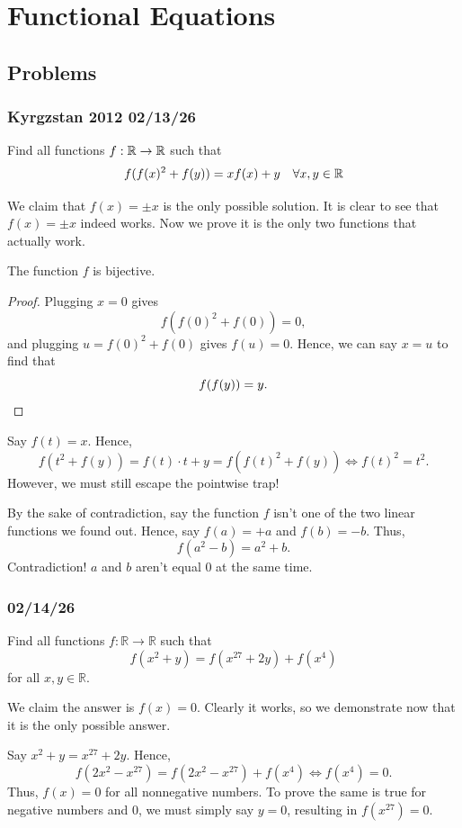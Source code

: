\section{\textsf{Functional Equations}}
\subsection{Problems}
\subsubsection{Kyrgzstan 2012 02/13/26}
\begin{problem}
Find all functions $ f:\mathbb{R}\to\mathbb{R} $ such that
\[
	f(f(x)^2+f(y)) = xf(x)+y \quad \forall x,y\in \mathbb{R}
\]
\end{problem}
We claim that $f(x)=\pm x$ is the only possible solution. It is clear to see that $f(x)=\pm x$ indeed works.
Now we prove it is the only two functions that actually work.

\begin{claim}
	The function $f$ is bijective.
\end{claim}
\begin{proof}
	Plugging $x=0$ gives
	\[
		f(f(0)^2+f(0))=0,
	\]
	and plugging $u=f(0)^2+f(0)$ gives $f(u)=0$. Hence, we can say $x=u$ to find that
	\[
		f(f(y))=y. \qedhere
	\]
\end{proof}
Say $f(t)=x$. Hence,
\[
	f(t^2+f(y))=f(t)\cdot t + y= f(f(t)^2+f(y)) \iff f(t)^2=t^2.
\]
However, we must still escape the pointwise trap!

By the sake of contradiction, say the function $f$ isn't one of the two linear functions we found out. Hence, say
$f(a)=+a$ and $f(b)=-b$. Thus,
\[
	f(a^2-b)=a^2+b.
\]
Contradiction! $a$ and $b$ aren't equal 0 at the same time.


\clearpage

\subsubsection{02/14/26}
\begin{problem}
Find all functions $f:\mathbb{R}\to\mathbb{R}$ such that
\[
	f(x^{2}+y)=f(x^{27}+2y)+f(x^{4})
\]
for all $x,y\in\mathbb{R}$.
\end{problem}
We claim the answer is $f(x)=0$. Clearly it works, so we demonstrate now that it is the only possible answer.

Say $x^2+y=x^{27}+2y$. Hence,
\[
	f(2x^2-x^{27})=f(2x^2-x^{27})+f(x^4) \iff f(x^4)=0.
\]
Thus, $f(x)=0$ for all nonnegative numbers. To prove the same is true for negative numbers and $0$,
we must simply say $y=0$, resulting in $f(x^{27})=0$.

